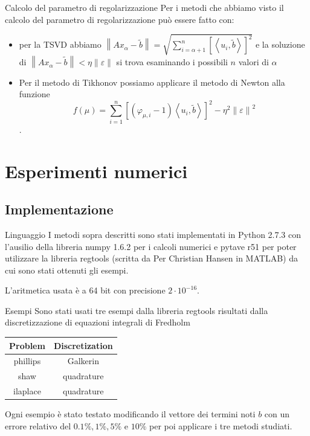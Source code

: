\documentclass{beamer}
\theoremstyle{plain}
\theoremstyle{definition}
\theoremstyle{remark}
\newcommand{\pa}[1]{\left(#1\right)}
\newcommand{\ang}[1]{\left<#1\right>}
\newcommand{\bra}[1]{\left[#1\right]}
\newcommand{\norm}[1]{\left\|#1\right\|}
\begin{document}
\begin{frame}{Calcolo del parametro di regolarizzazione}
  Per i metodi che abbiamo visto il calcolo del parametro di
  regolarizzazione può essere fatto con:
  \begin{itemize}
  \item per la TSVD abbiamo $\norm{ Ax_\alpha - \tilde b } =
    \sqrt{\sum _{i=\alpha +1} ^n \bra{ \ang{ u_i, \tilde b} } ^2 }$ e
    la soluzione di $\norm{ Ax_\alpha - \tilde b } <\eta
    \norm{\varepsilon}$ si trova esaminando i possibili $n$ valori di
    $\alpha$
  \item Per il metodo di Tikhonov possiamo applicare il metodo di
    Newton alla funzione \[f(\mu) = \sum _{i=1} ^n \bra{ \pa{ \varphi
        _{\mu,i} -1} \ang{ u_i, \tilde b} } ^2 - \eta ^2
    \norm{\varepsilon} ^2 \].
  \end{itemize}
\end{frame}

\section{Esperimenti numerici}

\subsection{Implementazione}

\begin{frame}{Linguaggio}
  I metodi sopra descritti sono stati implementati in Python 2.7.3 con
  l'ausilio della libreria numpy 1.6.2 per i calcoli numerici e pytave
  r51 per poter utilizzare la libreria regtools (scritta da  Per
  Christian Hansen in MATLAB) da cui sono stati ottenuti gli esempi.
  \vfill
  
  L'aritmetica usata è a 64 bit con precisione $2\cdot 10^{-16}$.
\end{frame}

\begin{frame}{Esempi}
  Sono stati usati tre esempi dalla libreria regtools risultati dalla
  discretizzazione di equazioni integrali di Fredholm
  \begin{center}
    \begin{tabular}[c]{c | c}
      \textbf{Problem} & \textbf{Discretization} \\
      \hline
      phillips & Galkerin \\
      shaw & quadrature \\
      ilaplace & quadrature 
    \end{tabular}
  \end{center}
  \vfill
  
  Ogni esempio è stato testato modificando il vettore dei termini noti
  $b$ con un errore relativo del $0.1\%, 1\%, 5\%$ e $10\%$ per poi
  applicare i tre metodi studiati.  
\end{frame}
\end{document}
